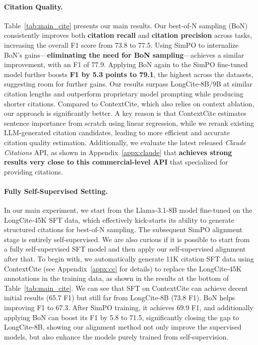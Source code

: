 \paragraph{Citation Quality.}
Table~\ref{tab:main_cite} presents our main results. Our best-of-N sampling (BoN) consistently improves both \textbf{citation recall} and \textbf{citation precision} across tasks, increasing the overall F1 score from 73.8 to 77.5. Using SimPO to internalize BoN’s gains—\textbf{eliminating the need for BoN sampling}—achieves a similar improvement, with an F1 of 77.9. Applying BoN again to the SimPO fine-tuned model further boosts \textbf{F1 by 5.3 points to 79.1}, the highest across the datasets, suggesting room for further gains.
Our results surpass LongCite-8B/9B at similar citation lengths and outperform proprietary model prompting while producing shorter citations. Compared to ContextCite, which also relies on context ablation, our approach is significantly better. A key reason is that ContextCite estimates sentence importance from scratch using linear regression, while we rerank existing LLM-generated citation candidates, leading to more efficient and accurate citation quality estimation. Additionally, we evaluate the latest released \emph{Claude Citations} API, as shown in Appendix~\ref{appx:claude} that \textbf{\ours achieves strong results very close to this commercial-level API} that specialized for providing citations.

\paragraph{Fully Self-Supervised Setting.}

In our main experiment, we start from the Llama-3.1-8B model fine-tuned on the LongCite-45K SFT data, which effectively kick-starts its ability to generate structured citations for best-of-N sampling. The subsequent SimPO alignment stage is entirely self-supervised. We are also curious if it is possible to start from a fully self-supervised SFT model and then apply our self-supervised alignment after that. To begin with, we automatically generate 11K citation SFT data using ContextCite (see Appendix~\ref{appx:cc} for details) to replace the LongCite-45K annotations in the training data, as shown in the results at the bottom of Table~\ref{tab:main_cite}. We can see that SFT on ContextCite can achieve decent initial results (65.7 F1) but still far from LongCite-8B (73.8 F1). BoN helps improving F1 to 67.3. After SimPO training, it achieves 69.9 F1, and additionally applying BoN can boost its F1 by 5.8 to 71.5, significantly closing the gap to LongCite-8B, showing our alignment method not only improve the supervised models, but also enhance the models purely trained from self-supervision.

